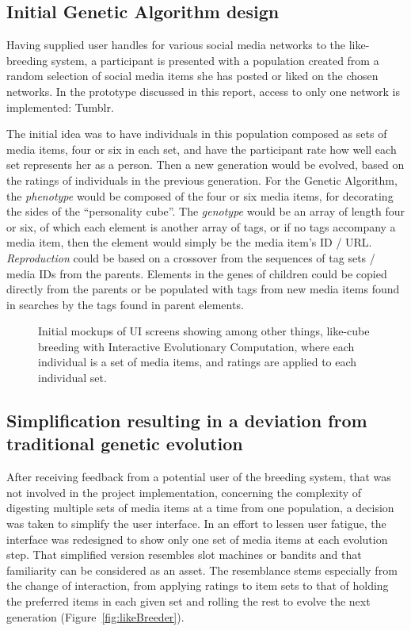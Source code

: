 \documentclass[]{article}
\begin{document}
\subsection{Initial Genetic Algorithm design}

Having supplied user handles for various social media networks to the like-breeding system, a participant is presented with a population created from a random selection of social media items she has posted or liked on the chosen networks.  In the prototype discussed in this report, access to only one network is implemented:  Tumblr.

The initial idea was to have individuals in this population composed as sets of media items, four or six in each set, and have the participant rate how well each set represents her as a person.  Then a new generation would be evolved, based on the ratings of individuals in the previous generation.  For the Genetic Algorithm, the \textit{phenotype} would be composed of the four or six media items, for decorating the sides of the “personality cube”.  
The \textit{genotype} would be an array of length four or six, of which each element is another array of tags, or if no tags accompany a media item, then the element would simply be the media item's ID / URL.
\textit{Reproduction} could be based on a crossover from the sequences of tag sets / media IDs from the parents.  
Elements in the genes of children could be copied directly from the parents or be populated with tags from new media items found in searches by the tags found in parent elements.

\begin{figure}[htp]
	\caption{Initial mockups of UI screens showing among other things, like-cube breeding with Interactive Evolutionary Computation, where each individual is a set of media items, and ratings are applied to each individual set.}
	\label{fig:breedingMockup}
\end{figure}


\subsection{Simplification resulting in a deviation from traditional genetic evolution}

After receiving feedback from a potential user of the breeding system, that was not involved in the project implementation, concerning the complexity of digesting multiple sets of media items at a time from one population, a decision was taken to simplify the user interface.  In an effort to lessen user fatigue, the interface was redesigned to show only one set of media items at each evolution step.  That simplified version resembles slot machines or bandits and that familiarity can be considered as an asset.  The resemblance stems especially from the change of interaction, from applying ratings to item sets to that of holding the preferred items in each given set and rolling the rest to evolve the next generation (Figure~\ref{fig:likeBreeder}).
\end{document}
